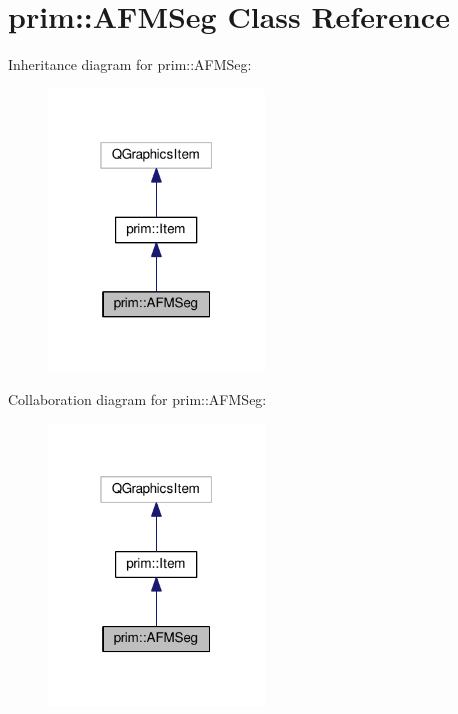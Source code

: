 \hypertarget{classprim_1_1AFMSeg}{}\section{prim\+:\+:A\+F\+M\+Seg Class Reference}
\label{classprim_1_1AFMSeg}


Inheritance diagram for prim\+:\+:A\+F\+M\+Seg\+:\nopagebreak
\begin{figure}[H]
\begin{center}
\leavevmode
\includegraphics[width=163pt]{classprim_1_1AFMSeg__inherit__graph}
\end{center}
\end{figure}


Collaboration diagram for prim\+:\+:A\+F\+M\+Seg\+:\nopagebreak
\begin{figure}[H]
\begin{center}
\leavevmode
\includegraphics[width=163pt]{classprim_1_1AFMSeg__coll__graph}
\end{center}
\end{figure}
